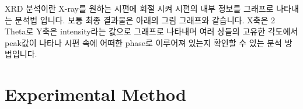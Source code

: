 \documentclass[a4paper, 10pt, nanum]{CSUniSchoolLabReport}
\begin{document}
	XRD 분석이란 X-ray를 원하는 시편에 회절 시켜 시편의 내부 정보를 그래프로 나타내는 분석법 입니다. 보통 최종 결과물은 아래의 그림 그래프와 같습니다. X축은 2 Theta로 Y축은 intensity라는 값으로 그래프로 나타내며 여러 상들의 고유한 각도에서 peak값이 나타나 시편 속에 어떠한 phase로 이루어져 있는지 확인할 수 있는 분석 방법입니다.


\section{Experimental Method}

\end{document}
